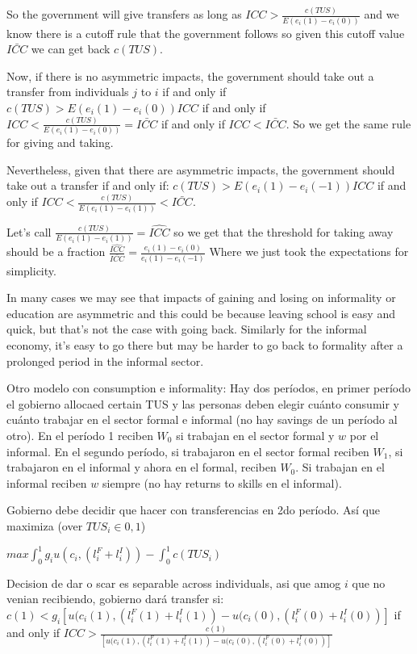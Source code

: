 \documentclass[12pt]{article}
\begin{document}
So the government will give transfers as long as $ICC>\frac{c(TUS)}{E(e_i(1)-e_i(0))}$ and we know there is a cutoff rule that the government follows so given this cutoff value $\bar{ICC}$ we can get back $c(TUS)$.

Now, if there is no asymmetric impacts, the government should take out a transfer from individuals $j$ to $i$ if and only if $c(TUS)>E(e_i(1)-e_i(0))ICC$ if and only if $ICC<\frac{c(TUS)}{E(e_i(1)-e_i(0))}=\bar{ICC}$ if and only if $ICC<\bar{ICC}$. So we get the same rule for giving and taking.

Nevertheless, given that there are asymmetric impacts, the government should take out a transfer if and only if: $c(TUS)>E(e_i(1)-e_i(-1))ICC$ if and only if $ICC<\frac{c(TUS)}{E(e_i(1)-e_i(1))}<\bar{ICC}$.

Let's call $\frac{c(TUS)}{E(e_i(1)-e_i(1))}=\hat{ICC}$ so we get that the threshold for taking away should be a fraction $\frac{\hat{ICC}}{\bar{ICC}}=\frac{e_i(1)-e_i(0)}{e_i(1)-e_i(-1)}$ Where we just took the expectations for simplicity.


In many cases we may see that impacts of gaining and losing on informality or education are asymmetric and this could be because leaving school is easy and quick, but that's not the case with going back. Similarly for the informal economy, it's easy to go there but may be harder to go back to formality after a prolonged period in the informal sector.

Otro modelo con consumption e informality:
Hay dos períodos, en primer período el gobierno allocaed certain TUS y las personas deben elegir cuánto consumir y cuánto trabajar en el sector formal e informal (no hay savings de un período al otro). En el período 1 reciben $W_0$ si trabajan en el sector formal y $w$ por el informal. En el segundo período, si trabajaron en el sector formal reciben $W_1$, si trabajaron en el informal y ahora en el formal, reciben $W_0$. Si trabajan en el informal reciben $w$ siempre (no hay returns to skills en el informal).

Gobierno debe decidir que hacer con transferencias en 2do período. Así que maximiza (over ${TUS_i}\in{0,1}$)


$max \int_{0}^{1}g_i u(c_i,(l^F_i+l^I_i)) - \int_{0}^{1}c(TUS_i)$

Decision de dar o scar es separable across individuals, asi que amog $i$ que no venian recibiendo, gobierno dará transfer si: $c(1)<g_i[u(c_i(1),(l^F_i(1)+l^I_i(1))-u(c_i(0),(l^F_i(0)+l^I_i(0))]$ if and only if $ICC>\frac{c(1)}{[u(c_i(1),(l^F_i(1)+l^I_i(1))-u(c_i(0),(l^F_i(0)+l^I_i(0))]}$
\end{document}
